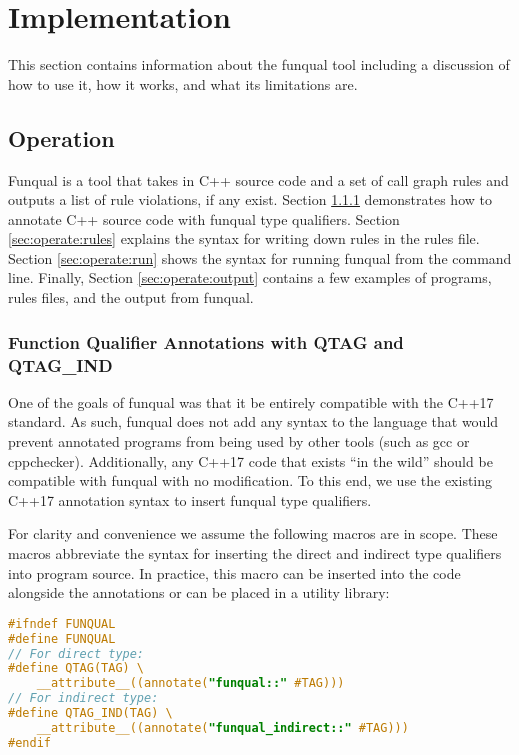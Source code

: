 \chapter{Implementation}\label{sec:implementation}

This section contains information about the funqual tool including a discussion of how to use it, how it works, and what its limitations are. 

\section{Operation}\label{sec:operation}

Funqual is a tool that takes in C++ source code and a set of call graph rules and outputs a list of rule violations, if any exist.  Section \ref{sec:operate:annote} demonstrates how to annotate C++ source code with funqual type qualifiers.  Section \ref{sec:operate:rules} explains the syntax for writing down rules in the rules file.  Section \ref{sec:operate:run} shows the syntax for running funqual from the command line.  Finally, Section \ref{sec:operate:output} contains a few examples of programs, rules files, and the output from funqual.  

\subsection{Function Qualifier Annotations with QTAG and QTAG\_IND}\label{sec:operate:annote}

One of the goals of funqual was that it be entirely compatible with the C++17 standard.  As such, funqual does not add any syntax to the language that would prevent annotated programs from being used by other tools (such as gcc or cppchecker).  Additionally, any C++17 code that exists ``in the wild'' should be compatible with funqual with no modification.  To this end, we use the existing C++17 annotation syntax to insert funqual type qualifiers.  

For clarity and convenience we assume the following macros are in scope.  These macros abbreviate the syntax for inserting the direct and indirect type qualifiers into program source.  In practice, this macro can be inserted into the code alongside the annotations or can be placed in a utility library:

\noindent\begin{minipage}[t]{\linewidth}
\begin{lstlisting}[language=C,caption={}]
#ifndef FUNQUAL
#define FUNQUAL
// For direct type:
#define QTAG(TAG) \
    __attribute__((annotate("funqual::" #TAG)))
// For indirect type:
#define QTAG_IND(TAG) \
    __attribute__((annotate("funqual_indirect::" #TAG)))
#endif
\end{lstlisting}
\end{minipage}

